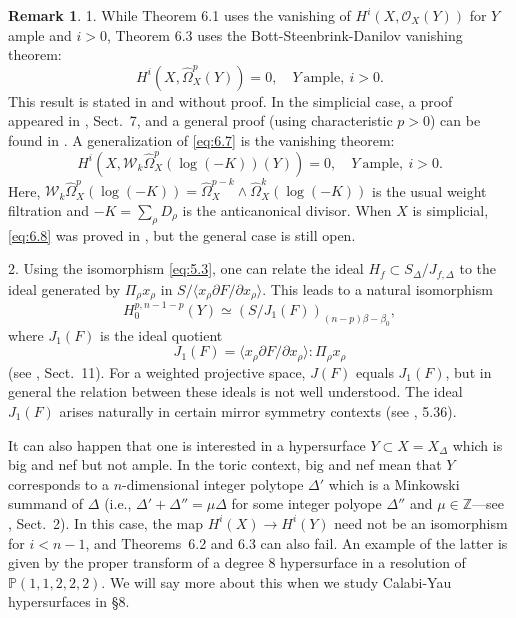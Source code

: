 \documentclass{amsart}
\theoremstyle{plain}
\theoremstyle{definition}
\newtheorem*{remark}{Remark}
\begin{document}
\begin{remark} 1. While Theorem 6.1 uses the vanishing of
$H^i(X,\mathcal{O}_X(Y))$ for $Y$ ample and $i > 0$, Theorem 6.3 uses the
Bott-Steenbrink-Danilov vanishing theorem:
\begin{equation}
H^i(X,\widehat\Omega^p_X(Y)) = 0,\quad Y\ \mathrm{ample},\ i> 0.
\tag{6.7}\label{eq:6.7}
\end{equation}
This result is stated in \cite{Dan2} and \cite{Oda2} without proof.  In
the simplicial case, a proof appeared in \cite{BC}, Sect.~7, and
a general proof (using characteristic $p > 0$) can be found in
\cite{BFLM}.  A generalization of \eqref{eq:6.7} is the vanishing
theorem:
\begin{equation}
H^i(X,\mathcal{W}_k\widehat\Omega^p_X(\log (-K))(Y)) = 0,\quad Y\
\mathrm{ample},\ i> 0.
\tag{6.8}\label{eq:6.8}
\end{equation}
Here, $\mathcal{W}_k\widehat\Omega^p_X(\log (-K)) = \widehat\Omega^{p-k}_X
\wedge \widehat\Omega^k_X(\log (-K))$ is the usual weight filtration
and $-K = \sum_\rho D_\rho$ is the anticanonical divisor.
When $X$ is simplicial, \eqref{eq:6.8} was proved in \cite{BC}, but the
general case is still open.

	2. Using the isomorphism \eqref{eq:5.3}, one can relate the
ideal $H_f \subset S_\Delta/J_{f,\Delta}$ to the ideal generated by
$\Pi_\rho x_\rho$ in $S/\langle x_\rho \partial F/\partial
x_\rho\rangle$.  This leads to a natural isomorphism
\[
H_0^{p,n-1-p}(Y) \simeq (S/J_1(F))_{(n-p)\beta-\beta_0},
\]
where $J_1(F)$ is the ideal quotient
\[
J_1(F) = \langle x_\rho \partial F/\partial x_\rho\rangle :
{\textstyle{\Pi_\rho}} x_\rho
\]
(see \cite{BC}, Sect.~11).  For a weighted projective space,
$J(F)$ equals $J_1(F)$, but in general the relation between these
ideals is not well understood.  The ideal $J_1(F)$ arises naturally in
certain mirror symmetry contexts (see \cite{MP}, 5.36).
\end{remark}

	It can also happen that one is interested in a hypersurface $Y
\subset X = X_\Delta$ which is big and nef but not ample.  In the
toric context, big and nef mean that $Y$ corresponds to a
$n$-dimensional integer polytope $\Delta'$ which is a Minkowski
summand of $\Delta$ (i.e., $\Delta' + \Delta'' = \mu\Delta$ for some
integer polyope $\Delta''$ and $\mu \in \mathbb{Z}$---see \cite{BB3}, Sect.~2).  In this case, the map $H^i(X) \to H^i(Y)$ need not be an
isomorphism for $i < n-1$, and Theorems~6.2 and 6.3 can also fail.  An
example of the latter is given by the proper transform of a degree 8
hypersurface in a resolution of $\mathbb{P}(1,1,2,2,2)$.  We will say
more about this when we study Calabi-Yau hypersurfaces in \S8.
\end{document}
